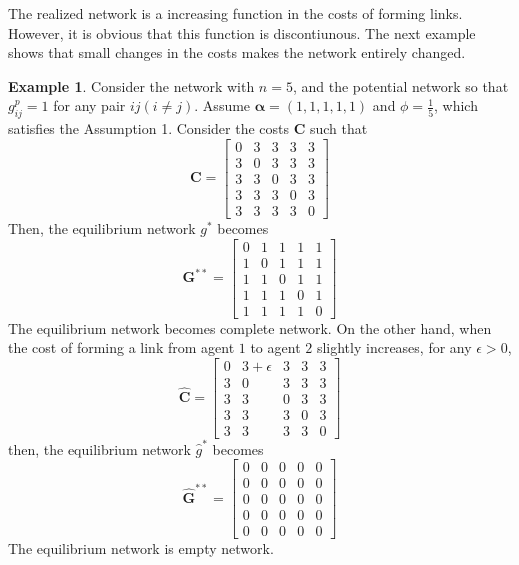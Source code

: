 \documentclass[12pt]{article}
\theoremstyle{definition}
\newtheorem{example}{Example}
\newcommand{\bm}[1]{\boldsymbol{#1}}
\begin{document}
The realized network is a increasing function in the costs of forming links.
However, it is obvious that this function is discontiunous.
The next example shows that small changes in the costs makes the network entirely changed.

\begin{example}
Consider the network with $n = 5$, and the potential network so that $g_{ij}^p = 1$ for any pair $ij(i \neq j)$.
Assume $\bm{\alpha} = (1, 1, 1, 1, 1)$ and $\phi = \frac{1}{5}$, which satisfies the Assumption 1.
Consider the costs $\bm{C}$ such that
\[ \bm{C} = \left[
			\begin{array}{ccccc}
				0 & 3 & 3 & 3 & 3 \\
				3 & 0 & 3 & 3 & 3 \\
				3 & 3 & 0 & 3 & 3 \\
				3 & 3 & 3 & 0 & 3  \\
				3 & 3 & 3 & 3 & 0
			\end{array} \right] \]
Then, the equilibrium network $g^*$ becomes
\[\bm{G}^{**} = \left[
			\begin{array}{ccccc}
				0 & 1 & 1 & 1 & 1 \\
				1 & 0 & 1 & 1 & 1 \\
				1 & 1 & 0 & 1 & 1 \\
				1 & 1 & 1 & 0 & 1 \\
				1 & 1 & 1 & 1 & 0
			\end{array} \right] \]
The equilibrium network becomes complete network.
On the other hand, when the cost of forming a link from agent $1$ to agent $2$ slightly increases, for any $\epsilon > 0$,
\[ \bm{\hat{C}} = \left[
			\begin{array}{ccccc}
				0 & 3 + \epsilon & 3 & 3 & 3 \\
				3 & 0 & 3 & 3 & 3 \\
				3 & 3 & 0 & 3 & 3 \\
				3 & 3 & 3 & 0 & 3  \\
				3 & 3 & 3 & 3 & 0
			\end{array} \right] \]
then, the equilibrium network $\hat{g}^*$ becomes
\[ \bm{\hat{G}}^{**} = \left[
			\begin{array}{ccccc}
				0 & 0 & 0 & 0 & 0 \\
				0 & 0 & 0 & 0 & 0 \\
				0 & 0 & 0 & 0 & 0 \\
				0 & 0 & 0 & 0 & 0 \\
				0 & 0 & 0 & 0 & 0
			\end{array} \right] \]
The equilibrium network is empty network.
\end{example}
\end{document}
